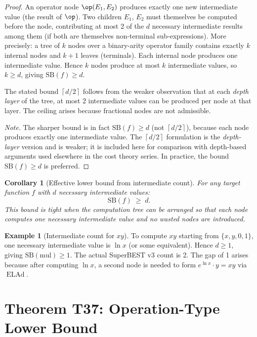 \documentclass[12pt,a4paper]{article}
\newtheorem{corollary}[theorem]{Corollary}
\theoremstyle{definition}
\newtheorem{example}[theorem]{Example}
\newcommand{\ELAd}{\operatorname{ELAd}}
\newcommand{\SB}{\mathrm{SB}}
\newcommand{\ceil}[1]{\left\lceil #1 \right\rceil}
\begin{document}
\begin{proof}
An operator node $\op(E_1,E_2)$ produces exactly one new intermediate value
(the result of $\op$).  Two children $E_1$, $E_2$ must themselves be computed
before the node, contributing at most 2 of the $d$ necessary intermediate
results among them (if both are themselves non-terminal sub-expressions).
More precisely: a tree of $k$ nodes over a binary-arity operator family
contains exactly $k$ internal nodes and $k+1$ leaves (terminals).  Each
internal node produces one intermediate value.  Hence $k$ nodes produce at
most $k$ intermediate values, so $k \geq d$, giving $\SB(f) \geq d$.

The stated bound $\ceil{d/2}$ follows from the weaker observation that at each
\emph{depth layer} of the tree, at most 2 intermediate values can be produced
per node at that layer.  The ceiling arises because fractional nodes are not
admissible.

\emph{Note.}  The sharper bound is in fact $\SB(f) \geq d$ (not $\ceil{d/2}$),
because each node produces exactly one intermediate value.  The $\ceil{d/2}$
formulation is the \emph{depth-layer} version and is weaker; it is included
here for comparison with depth-based arguments used elsewhere in the cost theory
series.  In practice, the bound $\SB(f) \geq d$ is preferred.
\end{proof}

\begin{corollary}[Effective lower bound from intermediate count]\label{cor:d}
For any target function $f$ with $d$ necessary intermediate values:
\[
  \SB(f) \;\geq\; d.
\]
This bound is tight when the computation tree can be arranged so that each node
computes one necessary intermediate value and no wasted nodes are introduced.
\end{corollary}

\begin{example}[Intermediate count for $xy$]\label{ex:mulinter}
To compute $xy$ starting from $\{x, y, 0, 1\}$, one necessary intermediate
value is $\ln x$ (or some equivalent).  Hence $d \geq 1$, giving $\SB(\mathrm{mul}) \geq 1$.
The actual SuperBEST v3 count is 2.  The gap of 1 arises because after computing
$\ln x$, a second node is needed to form $e^{\ln x}\cdot y = xy$ via $\ELAd$.
\end{example}

\section{Theorem T37: Operation-Type Lower Bound}
\end{document}
